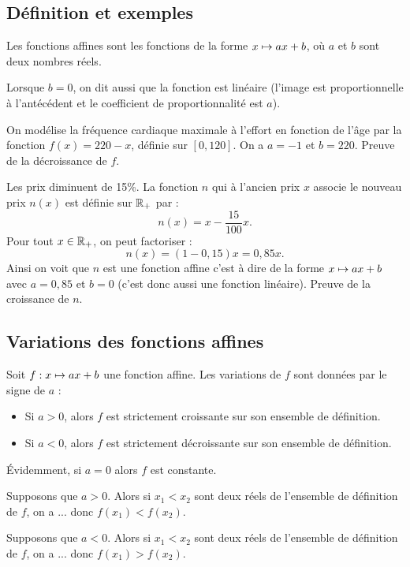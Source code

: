 \documentclass[a4paper,11pt,DIV18,BCOR0mm]{scrartcl}
\begin{document}
\subsection{Définition et exemples}
\begin{definition}
 Les fonctions affines sont les fonctions de la forme $x\mapsto ax+b$, o\`u $a$ et $b$ sont deux nombres réels.
\end{definition}
\begin{remarque}
 Lorsque $b=0$, on dit aussi que la fonction est linéaire (l'image est proportionnelle à l'antécédent
et le coefficient de proportionnalité est $a$).
\end{remarque}
\begin{exemple}
 On modélise la fréquence cardiaque maximale à l'effort en fonction de l'âge
par la fonction $f(x)=220-x$, définie sur $[0,120]$. On a $a=-1$ et $b=220$. Preuve de la décroissance de $f$.
\end{exemple}
\begin{exemple}
 Les prix diminuent de 15\%. La fonction $n$ qui à l'ancien prix $x$ associe le nouveau prix $n(x)$ est définie sur $\mathbb{R}_+$ par :
\[
 n(x)=x-\frac{15}{100}x.
\]
Pour tout $x\in\mathbb{R}_+$, on peut factoriser :
\[
 n(x)=(1-0,15)x=0,85x.
\]
Ainsi on voit que $n$ est une fonction affine c'est à dire de la forme $x\mapsto ax+b$ avec $a=0,85$ et $b=0$ (c'est donc aussi une fonction linéaire). Preuve de la croissance de $n$.
\end{exemple}
\subsection{Variations des fonctions affines}
\begin{theoreme}
 Soit $f:x\mapsto ax+b$ une fonction affine. Les variations de $f$ sont données par le signe de $a$ :
\begin{itemize}
 \item Si $a>0$, alors $f$ est strictement croissante sur son ensemble de définition.
  \item Si $a<0$, alors $f$ est strictement décroissante sur son ensemble de définition.
\end{itemize}
\end{theoreme}
\begin{remarque}
 Évidemment, si $a=0$ alors $f$ est constante.
\end{remarque}
\begin{demonstration}
 Supposons que $a>0$. Alors si $x_1<x_2$ sont deux réels de l'ensemble de définition de $f$, on a ... donc $f(x_1)<f(x_2)$.

Supposons que $a<0$. Alors si $x_1<x_2$ sont deux réels de l'ensemble de définition de $f$, on a ... donc $f(x_1)>f(x_2)$.
\end{demonstration}
\end{document}
